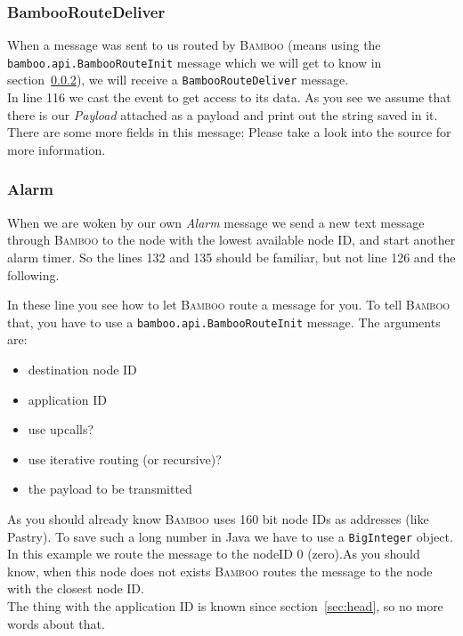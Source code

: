 \documentclass[twocolumn, twoside, a4paper]{article}
\begin{document}
\subsubsection{BambooRouteDeliver}
\label{sec:handleevent:sec:deliver}

When a message was sent to us routed by \textsc{Bamboo} (means using the
\texttt{bamboo.api.BambooRouteInit} message which we will get to know
in section~\ref{sec:handleevent:sec:alarm}), we will receive a
\texttt{BambooRouteDeliver} message.\\
In line 116 we cast the event to get access to its data. As you see we
assume that there is our \emph{Payload} attached as a payload and
print out the string saved in it. There are some more fields in this
message: Please take a look into the source for more information.


\subsubsection{Alarm}
\label{sec:handleevent:sec:alarm}

When we are woken by our own \emph{Alarm} message we send a new text
message through \textsc{Bamboo} to the node with the lowest available node ID,
and start another alarm timer. So the lines 132 and 135 should be
familiar, but not line 126 and the following.

In these line you see how to let \textsc{Bamboo} route a message for you. To
tell \textsc{Bamboo} that, you have to use a \texttt{bamboo.api.BambooRouteInit}
message. The arguments are:

\begin{itemize}
\item destination node ID
\item application ID
\item use upcalls?
\item use iterative routing (or recursive)?
\item the payload to be transmitted
\end{itemize}

As you should already know \textsc{Bamboo} uses 160 bit node IDs as addresses
(like Pastry). To save such a long number in Java we have to
use a \texttt{BigInteger} object. In this example we route the message
to the nodeID 0 (zero).As you should know, when this node
does not exists \textsc{Bamboo} routes the message to the node with the closest
node ID.\\
The thing with the application ID is known since
section~\ref{sec:head}, so no more words about that.
\end{document}
